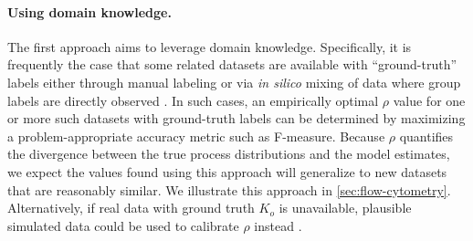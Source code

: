 \paragraph{Using domain knowledge.}
The first approach aims to leverage domain knowledge. %
Specifically, it is frequently the case that some related datasets are available with ``ground-truth'' labels either
through manual labeling or via \emph{in silico} mixing of data where group labels are directly observed \citep[see, e.g.,][]{Souto:2008}.
In such cases, an empirically optimal $\rho$ value %
for one or more such datasets with ground-truth labels
can be determined by maximizing a problem-appropriate accuracy metric such as F-measure.
Because $\rho$ quantifies the divergence between the true process distributions and the model estimates,
we expect the values found using this approach will generalize to new datasets that are reasonably similar.
We illustrate this approach in \cref{sec:flow-cytometry}.
Alternatively, if real data with ground truth $K_o$ is unavailable, plausible simulated data could 
be used to calibrate $\rho$ instead \citep{Xue:2024}.

